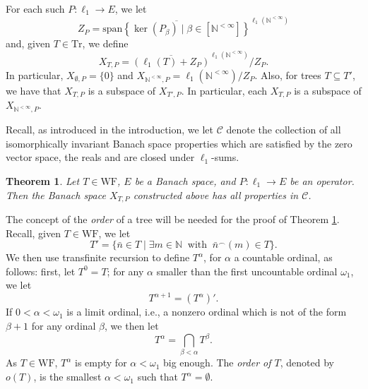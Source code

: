 \documentclass[letterpaper]{amsart}
\numberwithin{equation}{section}
\newtheorem{theorem}{Theorem}[section]
\theoremstyle{definition}
\newcommand{\N}{{\mathbb{N}}}
\newcommand{\WF}{\mathrm{WF}}
\newcommand{\Tr}{\mathrm{Tr}}
\begin{document}
For each such $P\colon \ell_1\to E$,   we let 
\[Z_P=\overline{\mathrm{span} \left\{\ker(P_{\beta})\mid \beta\in [\N^{<\infty}]\right\}}^{\ell_1(\N^{<\infty})}\]
and, given $T\in \Tr$, we define 
\[X_{T,P}=\overline{(\ell_1(T)+Z_P)}^{\ell_1(\N^{<\infty})}/Z_P.\]
In particular, $X_{\emptyset,P}=\{0\}$ and $X_{\N^{<\infty},P}=\ell_1(\N^{<\infty})/Z_P$. Also, for trees $T\subseteq T'$, we have that $X_{T,P}$ is a subspace of $X_{T',P}$. In particular, each $X_{T,P}$ is a subspace of $X_{\N^{<\infty},P}$.

 
Recall, as introduced in the introduction, we let $\mathcal C$ denote the collection of all isomorphically invariant Banach space properties which are satisfied by the zero vector space, the reals and are closed under $\ell_1$-sums. 

 
\begin{theorem}\label{TheoremWFhasAP}
   Let $T\in \WF$, $E$ be a Banach space, and  $P\colon \ell_1\to E$ be an operator. Then the Banach space $X_{T,P}$ constructed above  has all properties in  $\mathcal C$. 
\end{theorem}

The concept of the \emph{order} of a tree will be needed for the proof of Theorem \ref{TheoremWFhasAP}. Recall, given $T\in \WF$, we let
\[T'=\{\bar n\in T\mid \exists m\in \N \ \text{ with }\ 
 \bar n^\smallfrown (m)\in T\}.\] We  then use transfinite recursion to define $T^\alpha$, for $\alpha$ a countable ordinal,  as follows: first, let $T^0=T$; for any $\alpha$ smaller than the first uncountable ordinal $\omega_1$, we let
 \[T^{\alpha+1}=(T^\alpha)'.\]
If $0<\alpha<\omega_1$ is a limit ordinal, i.e., a nonzero ordinal which is not of the form $\beta+1$ for any ordinal $\beta$, we then let
\[T^\alpha=\bigcap_{\beta<\alpha}T^\beta.\]
As $T\in \WF$, $T^\alpha$ is empty for $\alpha<\omega_1$ big enough. The \emph{order of $T$}, denoted by $o(T)$, is the smallest $\alpha<\omega_1$ such that $T^\alpha=\emptyset$.
\end{document}
